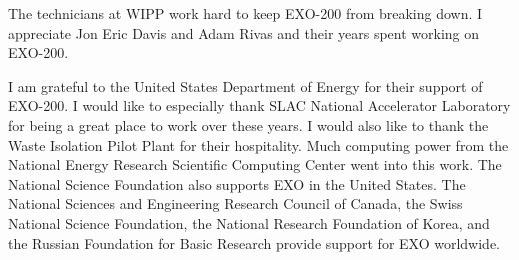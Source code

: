 The technicians at WIPP work hard to keep EXO-200 from breaking down. I appreciate Jon Eric Davis and Adam Rivas and their years spent working on EXO-200.

I am grateful to the United States Department of Energy for their support of EXO-200. I would like to especially thank SLAC National Accelerator Laboratory for being a great place to work over these years. I would also like to thank the Waste Isolation Pilot Plant for their hospitality. Much computing power from the National Energy Research Scientific Computing Center went into this work. The National Science Foundation also supports EXO in the United States. The National Sciences and Engineering Research Council of Canada, the Swiss National Science Foundation, the National Research Foundation of Korea, and the Russian Foundation for Basic Research provide support for EXO worldwide.
